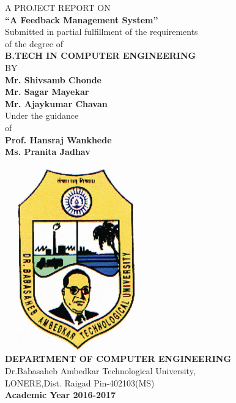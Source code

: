 \documentclass[12 pt,a4paper]{report}
\begin{document}
\begin{titlepage}
\begin{center}
\hspace{1 cm} A PROJECT REPORT ON 
\vspace{1 cm}
\\
\textbf{“A Feedback Management System”} 
\vspace{1 cm}
\\
Submitted in partial fulfillment of the requirements 
\vspace{0.5 cm}
\\
of the degree of
\vspace{1 cm}
\\
\textbf{B.TECH IN COMPUTER ENGINEERING}
\vspace{0.5 cm}
\\
BY
\vspace{0.5 cm}
\\
\textbf{Mr. Shivsamb Chonde}\\
\textbf{Mr. Sagar Mayekar}\\
\textbf{Mr. Ajaykumar Chavan}
\vspace{0.5 cm}
\\
Under the guidance
\vspace{0.6 cm}
\\
of 
\vspace{0.6 cm}
\\
\textbf{Prof. Hansraj Wankhede}
\\  
\textbf{Ms. Pranita Jadhav}  
\\

\begin{center}
\includegraphics[scale=.7]{logo.png}
\vspace{1 cm}
\\
\textbf{DEPARTMENT OF COMPUTER ENGINEERING}
\vspace{0.5 cm}
\\
Dr.Babasaheb Ambedkar Technological University,
\\
LONERE,Dist. Raigad Pin-402103(MS)
\\
\textbf{Academic Year 2016-2017}
\end{center}
\end{center}
\end{titlepage}
\end{document}
